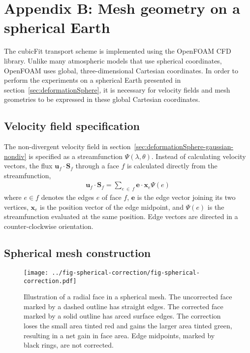 \section*{Appendix B: Mesh geometry on a spherical Earth}

The cubicFit transport scheme is implemented using the OpenFOAM CFD library.  Unlike many atmospheric models that use spherical coordinates, OpenFOAM uses global, three-dimensional Cartesian coordinates.  In order to perform the experiments on a spherical Earth presented in section~\ref{sec:deformationSphere}, it is necessary for velocity fields and mesh geometries to be expressed in these global Cartesian coordinates.

\subsection*{Velocity field specification}
The non-divergent velocity field in section~\ref{sec:deformationSphere-gaussian-nondiv} is specified as a streamfunction $\Psi(\lambda, \theta)$.  Instead of calculating velocity vectors, the flux $\mathbf{u}_f \cdot \mathbf{S}_f$ through a face $f$ is calculated directly from the streamfunction,
\begin{align}
	\mathbf{u}_f \cdot \mathbf{S}_f	= \sum_{e\:\in\:f} \mathbf{e} \cdot \mathbf{x}_e \Psi(e) \label{eqn:nondiv-spherical-flux}
\end{align}
where $e \in f$ denotes the edges $e$ of face $f$, $\mathbf{e}$ is the edge vector joining its two vertices, $\mathbf{x}_e$ is the position vector of the edge midpoint, and $\Psi(e)$ is the streamfunction evaluated at the same position.
Edge vectors are directed in a counter-clockwise orientation.

\subsection*{Spherical mesh construction}

\begin{figure}
	\centering
	\texttt{[image: ../fig-spherical-correction/fig-spherical-correction.pdf]}
	\caption{Illustration of a radial face in a spherical mesh.  The uncorrected face marked by a dashed outline has straight edges.  The corrected face marked by a solid outline has arced surface edges.
	The correction loses the small area tinted red and gains the larger area tinted green, resulting in a net gain in face area.
	Edge midpoints, marked by black rings, are not corrected.}
	\label{fig:spherical-correction}
\end{figure}

